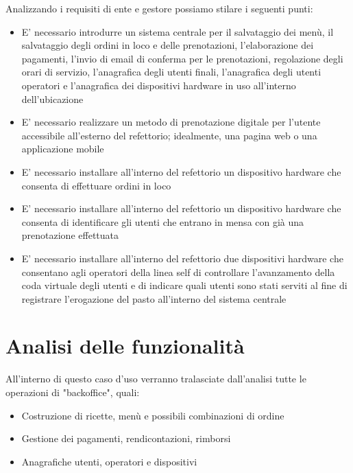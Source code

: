 \documentclass[a4paper, titlepage, 12pt, openright, twoside]{book}
\begin{document}
Analizzando i requisiti di ente e gestore possiamo stilare i seguenti punti:
\begin{itemize}
	\item E' necessario introdurre un sistema centrale per il salvataggio dei menù, il salvataggio degli ordini in loco e delle prenotazioni,
		  l'elaborazione dei pagamenti, l'invio di email di conferma per le prenotazioni, regolazione degli orari di servizio, l'anagrafica degli utenti finali, l'anagrafica degli
		  utenti operatori e l'anagrafica dei dispositivi hardware in uso all'interno dell'ubicazione
	\item E' necessario realizzare un metodo di prenotazione digitale per l'utente accessibile all'esterno del refettorio; idealmente, una pagina web o una applicazione mobile
	\item E' necessario installare all'interno del refettorio un dispositivo hardware che consenta di effettuare ordini in loco
	\item E' necessario installare all'interno del refettorio un dispositivo hardware che consenta di identificare gli utenti che entrano in mensa con già una prenotazione effettuata
	\item E' necessario installare all'interno del refettorio due dispositivi hardware che consentano agli operatori della linea self di controllare l'avanzamento della coda virtuale degli utenti e di indicare quali utenti sono stati serviti al fine di registrare l'erogazione del pasto all'interno del sistema centrale
\end{itemize}

\section{Analisi delle funzionalità}

All'interno di questo caso d'uso verranno tralasciate dall'analisi tutte le operazioni di "backoffice", quali:
\begin{itemize}
	\item Costruzione di ricette, menù e possibili combinazioni di ordine
	\item Gestione dei pagamenti, rendicontazioni, rimborsi
	\item Anagrafiche utenti, operatori e dispositivi
\end{itemize}
\end{document}
